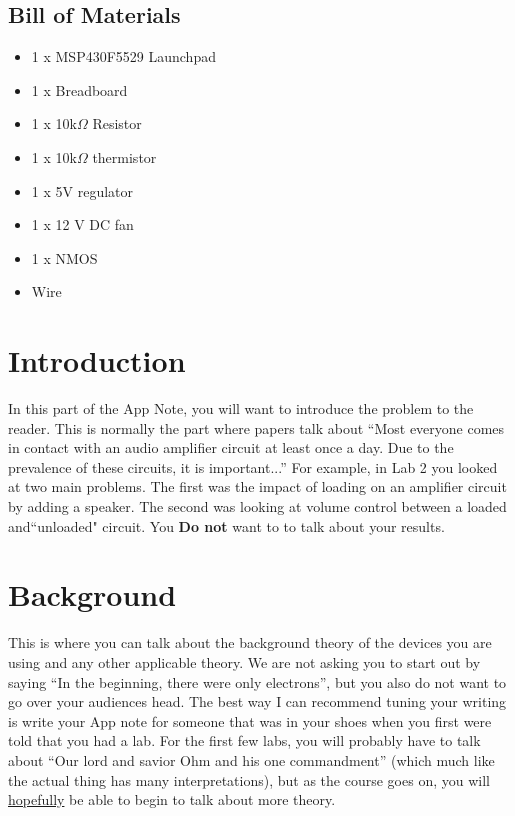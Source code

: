 \documentclass{hitec}
\begin{document}
\subsection{Bill of Materials}
\begin{itemize}
\item 1 x MSP430F5529 Launchpad
\item 1 x Breadboard
\item 1 x 10k$\Omega$ Resistor
\item 1 x 10k$\Omega$ thermistor
\item 1 x 5V regulator
\item 1 x 12 V DC fan
\item 1 x NMOS
\item Wire
\end{itemize}

\iffalse

\section{Introduction}
In this part of the App Note, you will want to introduce the problem to the reader. This is normally the part where papers talk about ``Most everyone comes in contact with an audio amplifier circuit at least once a day. Due to the prevalence of these circuits, it is important...'' For example, in Lab 2 you looked at two main problems. The first was the impact of loading on an amplifier circuit by adding a speaker. The second was looking at volume control between a loaded and``unloaded" circuit. You \textbf{Do not} want to to talk about your results.



\section{Background}
This is where you can talk about the background theory of the devices you are using and any other applicable theory. We are not asking you to start out by saying ``In the beginning, there were only electrons'', but you also do not want to go over your audiences head. The best way I can recommend tuning your writing is  write your App note for someone that was in your shoes when you first were told that you had a lab. For the first few labs, you will probably have to talk about ``Our lord and savior Ohm and his one commandment'' (which much like the actual thing has many interpretations), but as the course goes on, you will \underline{hopefully} be able to begin to talk about more theory.
\\
\end{document}
